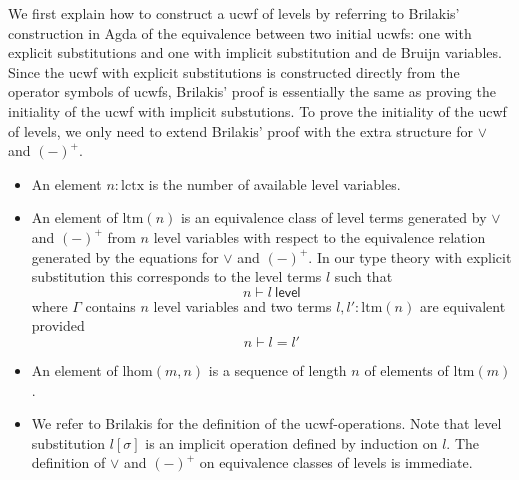 \documentclass[11pt,a4paper]{article}
\theoremstyle{plain}
\theoremstyle{definition}
\newcommand{\level}{\mathsf{level}}
\def\lhom{\mathrm{lhom}}
\def\lctx{\mathrm{lctx}}
\def\ltm{\mathrm{ltm}}
\def\lp{\mathrm{lp}}
\def\lq{\mathrm{lq}}
\def\s{\mathrm{s}}
\begin{document}
We first explain how to construct a ucwf of levels by referring to Brilakis'  \cite{Brilakis18} construction in Agda of the equivalence between two initial ucwfs: one with explicit substitutions and one with implicit substitution and de Bruijn variables. Since the ucwf with explicit substitutions is constructed directly from the operator symbols of ucwfs, Brilakis' proof is essentially the same as proving the initiality of the ucwf with implicit substutions. To prove the initiality of the ucwf of levels, we only need to extend Brilakis' proof with the extra structure for $\vee$ and $(-)^+$.
\begin{itemize}
\item An element $n : \lctx$ is the number of available level variables.
\item An element of $\ltm(n)$ is an equivalence class of level terms generated by $\vee$ and $(-)^+$ from $n$ level variables with respect to the equivalence relation generated by the equations for $\vee$ and $(-)^+$. In our type theory with explicit substitution \cite{BezemCDE22} this corresponds to the level terms $l$ such that
$$
n \vdash l\ \level
$$
where $\Gamma$ contains $n$ level variables and two terms $l, l' : \ltm(n)$ are equivalent provided
$$
n \vdash l = l'
$$
\item An element of $\lhom(m,n)$ is a sequence of length $n$ of elements of $\ltm(m)$.
\item We refer to Brilakis for the definition of the ucwf-operations. Note that level substitution $l[\sigma]$ is an implicit operation defined by induction on $l$. The definition of $\vee$ and $(-)^+$ on equivalence classes of levels is immediate.
\end{itemize}
\end{document}
